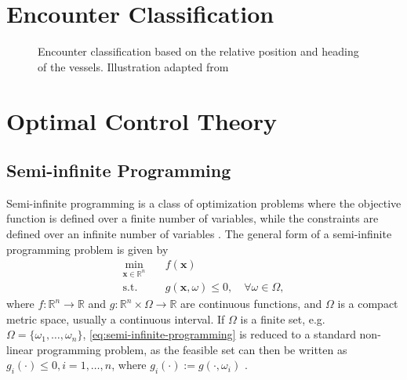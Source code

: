 \section{Encounter Classification}


\begin{figure}
    \centering
    
    \caption{Encounter classification based on the relative position and heading of the vessels. Illustration adapted from \cite{Thyri2022-Confined-Waters}}
    \label{fig:encounter-classification}
\end{figure}


\section{Optimal Control Theory}
\subsection{Semi-infinite Programming}\label{sec:semi-infinite-programming}

Semi-infinite programming is a class of optimization problems where the objective function is defined over a finite number of variables, while the constraints are defined over an infinite number of variables \citep{Bonnans2013-gt}. The general form of a semi-infinite programming problem is given by
\begin{equation}\label{eq:semi-infinite-programming}
    \begin{aligned}
        \min_{\mathbf x \in \mathbb R^n} \quad & f(\mathbf x) \\
        \text{s.t.} \quad & g(\mathbf x, \omega) \leq 0, \quad \forall \omega \in \Omega,
    \end{aligned}
\end{equation}
where $f : \mathbb R^n \to \mathbb R$ and $g : \mathbb R^n \times \Omega \to \mathbb R$ are continuous functions, and $\Omega$ is a compact metric space, usually a continuous interval. If $\Omega$ is a finite set, e.g. $\Omega = \{\omega_1,\ldots,\omega_n\}$, \cref{eq:semi-infinite-programming} is reduced to a standard non-linear programming problem, as the feasible set can then be written as $g_i(\cdot) \leq 0, i = 1,\ldots,n$, where $g_i(\cdot) := g(\cdot, \omega_i)$ \citep{Bonnans2013-gt}.

